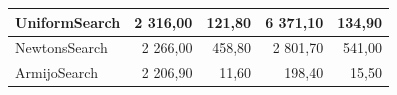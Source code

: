 \documentclass[a4paper,english,titlepage,12pt]{article}
\begin{document}
\begin{table}[]
\begin{tabular}{|l|r|r|r|r|}
    UniformSearch                                                             & \cellcolor[HTML]{FDF0EF}2 316,00                         & \cellcolor[HTML]{FDF0EF}121,80                            & \cellcolor[HTML]{E67B73}6 371,10                          & \cellcolor[HTML]{FDF0EF}134,90                            \\ \hline
    NewtonsSearch                                                             & 2 266,00                                                 & \cellcolor[HTML]{E67B73}458,80                            & \cellcolor[HTML]{F6CFCB}2 801,70                          & \cellcolor[HTML]{E67B73}541,00                            \\ \hline
    ArmijoSearch                                                              & \cellcolor[HTML]{E5F4ED}2 206,90                         & \cellcolor[HTML]{57BB89}11,60                             & \cellcolor[HTML]{57BB89}198,40                            & \cellcolor[HTML]{57BB89}15,50                             \\ \hline
    \end{tabular}
\end{table}
\end{document}
